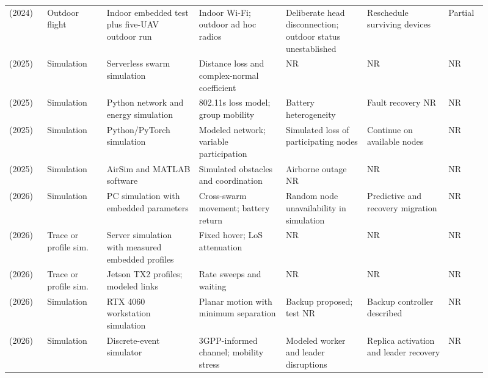 \begin{longtable}{@{}Y{0.075\linewidth}Y{0.116\linewidth}Y{0.17\linewidth}Y{0.163\linewidth}Y{0.156\linewidth}Y{0.153\linewidth}Y{0.077\linewidth}@{}}
\cite{R0014}\newline\mbox{(2024)} & Outdoor flight & Indoor embedded test plus five-UAV outdoor run & Indoor Wi-Fi; outdoor ad hoc radios & Deliberate head disconnection; outdoor status unestablished & Reschedule surviving devices & Partial \\
\cite{R0022}\newline\mbox{(2025)} & Simulation & Serverless swarm simulation & Distance loss and complex-normal coefficient & NR & NR & NR \\
\cite{R0083}\newline\mbox{(2025)} & Simulation & Python network and energy simulation & 802.11s loss model; group mobility & Battery heterogeneity & Fault recovery NR & NR \\
\cite{R0106}\newline\mbox{(2025)} & Simulation & Python\allowbreak{}/PyTorch simulation & Modeled network; variable participation & Simulated loss of participating nodes & Continue on available nodes & NR \\
\cite{R0223}\newline\mbox{(2025)} & Simulation & AirSim and MATLAB software & Simulated obstacles and coordination & Airborne outage NR & NR & NR \\
\cite{R0002}\newline\mbox{(2026)} & Simulation & PC simulation with embedded parameters & Cross-swarm movement; battery return & Random node unavailability in simulation & Predictive and recovery migration & NR \\
\cite{R0048}\newline\mbox{(2026)} & Trace or profile sim. & Server simulation with measured embedded profiles & Fixed hover; LoS attenuation & NR & NR & NR \\
\cite{R0075}\newline\mbox{(2026)} & Trace or profile sim. & Jetson TX2 profiles; modeled links & Rate sweeps and waiting & NR & NR & NR \\
\cite{R0095}\newline\mbox{(2026)} & Simulation & RTX 4060 workstation simulation & Planar motion with minimum separation & Backup proposed; test NR & Backup controller described & NR \\
\cite{R0110}\newline\mbox{(2026)} & Simulation & Discrete-event simulator & 3GPP-informed channel; mobility stress & Modeled worker and leader disruptions & Replica activation and leader recovery & NR \\

\end{longtable}
